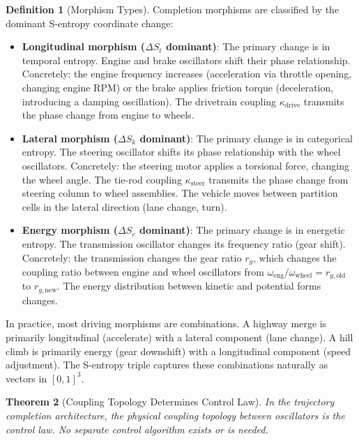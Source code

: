 \documentclass[twocolumn,10pt]{article}
\newtheorem{theorem}{Theorem}[section]
\theoremstyle{definition}
\newtheorem{definition}[theorem]{Definition}
\newcommand{\Sk}{S_k}
\newcommand{\St}{S_t}
\newcommand{\Se}{S_e}
\begin{document}
\begin{definition}[Morphism Types]
\label{def:morphism-types}
Completion morphisms are classified by the dominant S-entropy coordinate change:
\begin{itemize}[leftmargin=*]
\item \textbf{Longitudinal morphism ($\Delta \St$ dominant)}: The primary change is in temporal entropy. Engine and brake oscillators shift their phase relationship. Concretely: the engine frequency increases (acceleration via throttle opening, changing engine RPM) or the brake applies friction torque (deceleration, introducing a damping oscillation). The drivetrain coupling $\kappa_{\mathrm{drive}}$ transmits the phase change from engine to wheels.

\item \textbf{Lateral morphism ($\Delta \Sk$ dominant)}: The primary change is in categorical entropy. The steering oscillator shifts its phase relationship with the wheel oscillators. Concretely: the steering motor applies a torsional force, changing the wheel angle. The tie-rod coupling $\kappa_{\mathrm{steer}}$ transmits the phase change from steering column to wheel assemblies. The vehicle moves between partition cells in the lateral direction (lane change, turn).

\item \textbf{Energy morphism ($\Delta \Se$ dominant)}: The primary change is in energetic entropy. The transmission oscillator changes its frequency ratio (gear shift). Concretely: the transmission changes the gear ratio $r_g$, which changes the coupling ratio between engine and wheel oscillators from $\omega_{\mathrm{eng}}/\omega_{\mathrm{wheel}} = r_{g,\mathrm{old}}$ to $r_{g,\mathrm{new}}$. The energy distribution between kinetic and potential forms changes.
\end{itemize}
\end{definition}

In practice, most driving morphisms are combinations. A highway merge is primarily longitudinal (accelerate) with a lateral component (lane change). A hill climb is primarily energy (gear downshift) with a longitudinal component (speed adjustment). The S-entropy triple captures these combinations naturally as vectors in $[0,1]^3$.

\begin{theorem}[Coupling Topology Determines Control Law]
\label{thm:coupling-control}
In the trajectory completion architecture, the physical coupling topology between oscillators \emph{is} the control law. No separate control algorithm exists or is needed.
\end{theorem}
\end{document}
